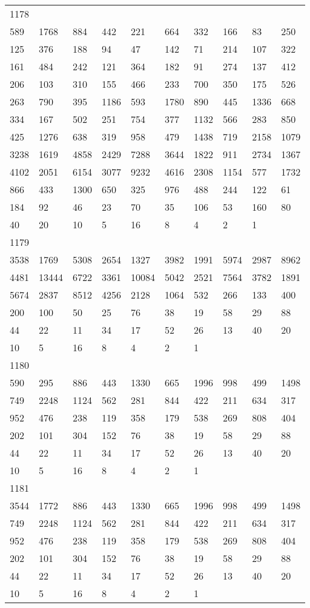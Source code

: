 \begin{longtable}{*{10}{l}}
1178&&&&&&&&&\\
589& 1768& 884& 442& 221& 664& 332& 166& 83& 250\\
125& 376& 188& 94& 47& 142& 71& 214& 107& 322\\
161& 484& 242& 121& 364& 182& 91& 274& 137& 412\\
206& 103& 310& 155& 466& 233& 700& 350& 175& 526\\
263& 790& 395& 1186& 593& 1780& 890& 445& 1336& 668\\
334& 167& 502& 251& 754& 377& 1132& 566& 283& 850\\
425& 1276& 638& 319& 958& 479& 1438& 719& 2158& 1079\\
3238& 1619& 4858& 2429& 7288& 3644& 1822& 911& 2734& 1367\\
4102& 2051& 6154& 3077& 9232& 4616& 2308& 1154& 577& 1732\\
866& 433& 1300& 650& 325& 976& 488& 244& 122& 61\\
184& 92& 46& 23& 70& 35& 106& 53& 160& 80\\
40& 20& 10& 5& 16& 8& 4& 2& 1& \\

1179&&&&&&&&&\\
3538& 1769& 5308& 2654& 1327& 3982& 1991& 5974& 2987& 8962\\
4481& 13444& 6722& 3361& 10084& 5042& 2521& 7564& 3782& 1891\\
5674& 2837& 8512& 4256& 2128& 1064& 532& 266& 133& 400\\
200& 100& 50& 25& 76& 38& 19& 58& 29& 88\\
44& 22& 11& 34& 17& 52& 26& 13& 40& 20\\
10& 5& 16& 8& 4& 2& 1& \\

1180&&&&&&&&&\\
590& 295& 886& 443& 1330& 665& 1996& 998& 499& 1498\\
749& 2248& 1124& 562& 281& 844& 422& 211& 634& 317\\
952& 476& 238& 119& 358& 179& 538& 269& 808& 404\\
202& 101& 304& 152& 76& 38& 19& 58& 29& 88\\
44& 22& 11& 34& 17& 52& 26& 13& 40& 20\\
10& 5& 16& 8& 4& 2& 1& \\

1181&&&&&&&&&\\
3544& 1772& 886& 443& 1330& 665& 1996& 998& 499& 1498\\
749& 2248& 1124& 562& 281& 844& 422& 211& 634& 317\\
952& 476& 238& 119& 358& 179& 538& 269& 808& 404\\
202& 101& 304& 152& 76& 38& 19& 58& 29& 88\\
44& 22& 11& 34& 17& 52& 26& 13& 40& 20\\
10& 5& 16& 8& 4& 2& 1& \\


\end{longtable}
